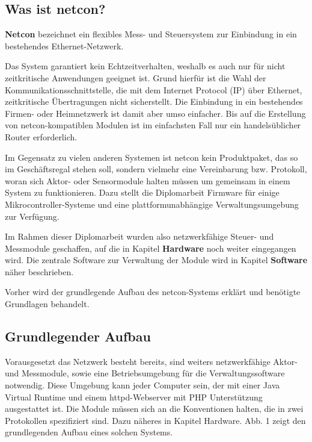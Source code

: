 \documentclass[a4paper,14pt,headsepline]{scrartcl}
\begin{document}
\subsection{Was ist netcon?}
\textbf{Netcon} bezeichnet ein flexibles Mess- und Steuersystem zur Einbindung in ein bestehendes Ethernet-Netzwerk. 

Das System garantiert kein Echtzeitverhalten, weshalb es auch nur für nicht zeitkritische Anwendungen geeignet ist. Grund hierfür ist die Wahl der Kommunikationsschnittstelle, die mit dem Internet Protocol (IP) über Ethernet, zeitkritische Übertragungen nicht sicherstellt. Die Einbindung in ein bestehendes Firmen- oder Heimnetzwerk ist damit aber umso einfacher. Bis auf die Erstellung von netcon-kompatiblen Modulen ist im einfachsten Fall nur ein handelsüblicher Router erforderlich.

Im Gegensatz zu vielen anderen Systemen ist netcon kein Produktpaket, das so im Geschäftsregal stehen soll, sondern vielmehr eine Vereinbarung bzw. Protokoll, woran sich Aktor- oder Sensormodule halten müssen um gemeinsam in einem System zu funktionieren. Dazu stellt die Diplomarbeit Firmware für einige Mikrocontroller-Systeme und eine plattformunabhängige Verwaltungsumgebung zur Verfügung. 

Im Rahmen dieser Diplomarbeit wurden also netzwerkfähige Steuer- und Messmodule geschaffen, auf die in Kapitel \textbf{Hardware} noch weiter eingegangen wird. Die zentrale Software zur Verwaltung der Module wird in Kapitel \textbf{Software} näher beschrieben. 

Vorher wird der grundlegende Aufbau des netcon-Systems erklärt und benötigte Grundlagen behandelt.

\subsection{Grundlegender Aufbau}
Vorausgesetzt das Netzwerk besteht bereits, sind weiters netzwerkfähige Aktor- und Messmodule, sowie eine Betriebsumgebung für die Verwaltungssoftware notwendig. Diese Umgebung kann jeder Computer sein, der mit einer Java Virtual Runtime und einem httpd-Webserver mit PHP Unterstützung ausgestattet ist. Die Module müssen sich an die Konventionen halten, die in zwei Protokollen spezifiziert sind. Dazu näheres in Kapitel Hardware. Abb. 1 zeigt den grundlegenden Aufbau eines solchen Systems. 
\end{document}
